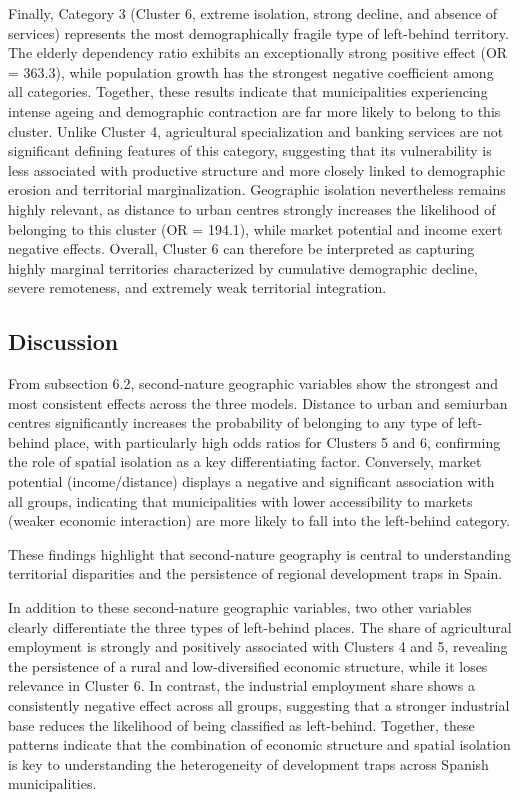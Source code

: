 \documentclass[a4paper,11pt,oneside]{article}
\begin{document}
Finally, Category 3 (Cluster 6, extreme isolation, strong decline, and absence of services) represents the most demographically fragile type of left-behind territory. The elderly dependency ratio exhibits an exceptionally strong positive effect (OR = 363.3), while population growth has the strongest negative coefficient among all categories. Together, these results indicate that municipalities experiencing intense ageing and demographic contraction are far more likely to belong to this cluster. Unlike Cluster 4, agricultural specialization and banking services are not significant defining features of this category, suggesting that its vulnerability is less associated with productive structure and more closely linked to demographic erosion and territorial marginalization. Geographic isolation nevertheless remains highly relevant, as distance to urban centres strongly increases the likelihood of belonging to this cluster (OR = 194.1), while market potential and income exert negative effects. Overall, Cluster 6 can therefore be interpreted as capturing highly marginal territories characterized by cumulative demographic decline, severe remoteness, and extremely weak territorial integration.







\subsection{Discussion}

From subsection 6.2, second-nature geographic variables show the strongest and most consistent effects across the three models. Distance to urban and semiurban centres significantly increases the probability of belonging to any type of left-behind place, with particularly high odds ratios for Clusters 5 and 6, confirming the role of spatial isolation as a key differentiating factor. Conversely, market potential (income/distance) displays a negative and significant association with all groups, indicating that municipalities with lower accessibility to markets (weaker economic interaction) are more likely to fall into the left-behind category.

These findings highlight that second-nature geography is central to understanding territorial disparities and the persistence of regional development traps in Spain.

In addition to these second-nature geographic variables, two other variables clearly differentiate the three types of left-behind places. The share of agricultural employment is strongly and positively associated with Clusters 4 and 5, revealing the persistence of a rural and low-diversified economic structure, while it loses relevance in Cluster 6. In contrast, the industrial employment share shows a consistently negative effect across all groups, suggesting that a stronger industrial base reduces the likelihood of being classified as left-behind. Together, these patterns indicate that the combination of economic structure and spatial isolation is key to understanding the heterogeneity of development traps across Spanish municipalities.
\end{document}

